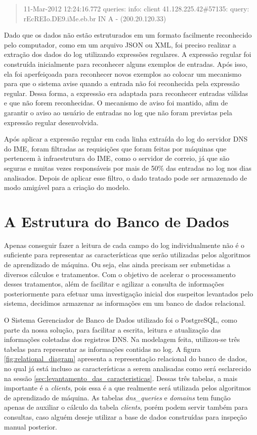 \begin{quote}
11-Mar-2012 12:24:16.772 queries: info: client 41.128.225.42\#57135: query: rEcREIo.DE9.iMe.eb.br IN A - (200.20.120.33)
\end{quote}

Dado que os dados não estão estruturados em um formato facilmente reconhecido pelo computador, como em um arquivo JSON ou XML, foi preciso realizar a extração dos dados do log utilizando expressões regulares. A expressão regular foi construída inicialmente para reconhecer alguns exemplos de entradas. Após isso, ela foi aperfeiçoada para reconhecer novos exemplos ao colocar um mecanismo para que o sistema avise quando a entrada não foi reconhecida pela expressão regular. Dessa forma, a expressão era adaptada para reconhecer entradas válidas e que não forem reconhecidas. O mecanismo de aviso foi mantido, afim de garantir o aviso ao usuário de entradas no log que não foram previstas pela expressão regular desenvolvida.

Após aplicar a expressão regular em cada linha extraída do log do servidor DNS do IME, foram filtradas as requisições que foram feitas por máquinas que pertencem à infraestrutura do IME, como o servidor de correio, já que são seguras e muitas vezes responsáveis por mais de 50\% das entradas no log nos dias analisados. Depois de aplicar esse filtro, o dado tratado pode ser armazenado de modo amigável para a criação do modelo.

\section{A Estrutura do Banco de Dados}
Apenas conseguir fazer a leitura de cada campo do log individualmente não é o suficiente para representar as características que serão utilizadas pelos algoritmos de aprendizado de máquina. Ou seja, elas ainda precisam ser submetidas a diversos cálculos e tratamentos. Com o objetivo de acelerar o processamento desses tratamentos, além de facilitar e agilizar a consulta de informações posteriormente para efetuar uma investigação inicial dos suspeitos levantados pelo sistema, decidimos armazenar as informações em um banco de dados relacional.

O Sistema Gerenciador de Banco de Dados utilizado foi o PostgreSQL, como parte da nossa solução, para facilitar a escrita, leitura e atualização das informações coletadas dos registros DNS. Na modelagem feita, utilizou-se três tabelas para representar as informações contidas no log. A figura \ref{fig:relational_diagram} apresenta a representação relacional do banco de dados, no qual já está incluso as características a serem analisadas como será esclarecido na sessão \ref{sec:levantamento_das_caracteristicas}. Dessas três tabelas, a mais importante é a \textit{clients}, pois essa é a que realmente será utilizada pelos algoritmos de aprendizado de máquina. As tabelas \textit{dns\_queries} e \textit{domains} tem função apenas de auxiliar o cálculo da tabela \textit{clients}, porém podem servir também para consultas, caso alguém deseje utilizar a base de dados construídas para inspeção manual posterior.

